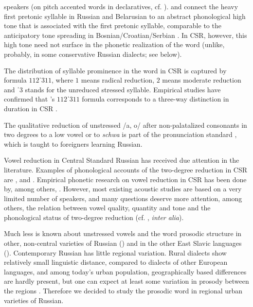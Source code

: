 \documentclass[output=paper,colorlinks,citecolor=black]{langscibook}
\begin{document}
speakers (on pitch accented words in declaratives, cf. \citealt{Kasatkina2005}). \citet{Dubina2012} and \citet{Molczanow2015} connect the heavy first pretonic syllable in Russian and Belarusian to an abstract phonological high tone that is associated with the first pretonic syllable, comparable to the anticipatory tone spreading in Bosnian/Croatian/Serbian \citep[175]{Dubina2012}. In CSR, however, this high tone need not surface in the phonetic realization of the word (unlike, probably, in some conservative Russian dialects; see  below).

The distribution of syllable prominence in the word in CSR is captured by  formula $112\text{ˈ}311$, where $1$ means radical reduction, $2$ means moderate reduction and $\text{ˈ}3$ stands for the unreduced stressed syllable. Empirical studies have confirmed that \citeauthor{Potebnja1866}’s $112\text{ˈ}311$ formula corresponds to a three-way distinction in duration in CSR \citep{BondarkoEtAl1966,Zlatoustova1981,Kuznecov1997,Barnes2006,Knjazev2006}. 

The qualitative reduction of unstressed /a, o/ after non-palatalized consonants in two degrees to a low vowel or to \textit{schwa} is part of the pronunciation standard \citep{Avanesov1984}, which is taught to foreigners learning Russian. 


\largerpage[-1]
Vowel reduction in Central Standard Russian has received due attention in the literature. Examples of phonological accounts of the two-degree reduction in CSR are \citet{Crosswhite2000}, \citet{Iosad2012} and \citet{Molczanow2015}. Empirical phonetic research on vowel reduction in CSR has been done by, among others, \citet{BondarkoEtAl1966,Zlatoustova1981,Kuznecov1997,PadgettTabain2005,Barnes2006,KocharovEtAl2015}. However, most existing acoustic studies are based on a very limited number of speakers, and many questions deserve more attention, among others, the relation between vowel quality, quantity and tone and the phonological status of two-degree reduction (cf. \citealt{Barnes2006,Bethin2006,Molczanow2015}, \textit{inter alia}).

Much less is known about unstressed vowels and the word prosodic structure in other, non-central varieties of Russian () and in the other East Slavic languages (). Contemporary Russian has little regional variation. Rural dialects show relatively small linguistic distance, compared to dialects of other European languages, and among today’s urban population, geographically based differences are hardly present, but one can expect at least some variation in prosody between the regions \citep{GrammatcikovaEtAl2013,Post2017}. Therefore we decided to study the prosodic word in regional urban varieties of Russian.
\end{document}
